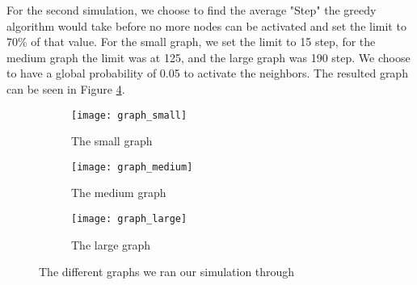 For the second simulation, we choose to find the average "Step" the greedy algorithm would take before no more nodes can be activated and set the limit to 70\% of that value. For the small graph, we set the limit to 15 step, for the medium graph the limit was at 125, and the large graph was 190 step. We choose to have a global probability of 0.05 to activate the neighbors. The resulted graph can be seen in Figure \ref{fig:graph}.  


\begin{figure}[!ht]
	\begin{subfigure}{0.3\textwidth}
		\texttt{[image: graph\_small]}
		\caption{The small graph} 
		\label{graphS}
	\end{subfigure}
	\begin{subfigure}{0.3\textwidth}
		\texttt{[image: graph\_medium]}
		\caption{The medium graph} 
		\label{graphM}
	\end{subfigure}
	\begin{subfigure}{0.3\textwidth}
		\texttt{[image: graph\_large]}
		\caption{The large graph} 
		\label{fig:graphL}
	\end{subfigure}

	\caption{The different graphs we ran our simulation through}
	\label{fig:graph}
\end{figure}

